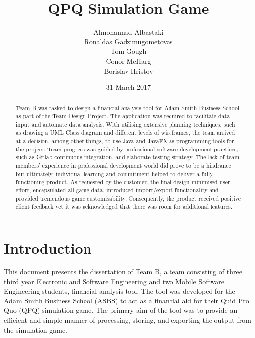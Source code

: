 \documentclass{l3proj}
\begin{document}
\title{QPQ Simulation Game}

\author{Almohannad Albastaki \\
        Ronaldas Gadzimugometovas \\
        Tom Gough \\
         Conor McHarg \\
        Borislav Hristov}

\date{31 March 2017}

\maketitle

\begin{abstract}

Team B was tasked to design a financial analysis tool for Adam Smith Business School as part of the Team Design Project. The application was required to facilitate data input and automate data analysis. With utilising extensive planning techniques, such as drawing a UML Class diagram and different levels of wireframes, the team arrived at a decision, among other things, to use Java and JavaFX as programming tools for the project. Team progress was guided by professional software development practices, such as Gitlab continuous integration, and elaborate testing strategy. The lack of team members' experience in professional development world did prove to be a hindrance but ultimately, individual learning and commitment helped to deliver a fully functioning product. As requested by the customer, the final design minimised user effort, encapsulated all game data, introduced import/export functionality and provided tremendous game customisability. Consequently, the product received positive client feedback yet it was acknowledged that there was room for additional features.

\end{abstract}

\educationalconsent

\newpage

\section{Introduction}
\label{sec:introduction}

This document presents the dissertation of Team B, a team consisting of three third year Electronic and Software Engineering and two Mobile Software Engineering students, financial analysis tool. The tool was developed for the Adam Smith Business School (ASBS) to act as a financial aid for their Quid Pro Quo (QPQ) simulation game. The primary aim of the tool was to provide an efficient and simple manner of processing, storing, and exporting the output from the simulation game.
\end{document}
